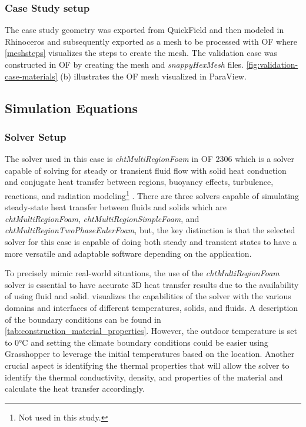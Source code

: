 \subsubsection{Case Study setup}
The case study geometry was exported from QuickField and then modeled in Rhinoceros and subsequently exported as a mesh to be processed with \gls{OF} where \ref{meshsteps} visualizes the steps to create the mesh. 
The validation case was constructed in \gls{OF} by creating the mesh and \textit{snappyHexMesh} files.  
\ref{fig:validation-case-materials}  (b) illustrates the \gls{OF} mesh visualized in ParaView.
    



\subsection{Simulation Equations}

\subsubsection{Solver Setup}
The solver used in this case is \textit{chtMultiRegionFoam} in  \gls{OF} 2306 which is a solver capable of solving for steady or transient fluid flow with solid heat conduction and conjugate heat transfer between regions, buoyancy effects, turbulence, reactions, and radiation modeling\footnote{Not used in this study.} \cite{cht}.
There are three solvers capable of simulating steady-state heat transfer between fluids and solids which are \textit{chtMultiRegionFoam}, \textit{chtMultiRegionSimpleFoam}, and \textit{chtMultiRegionTwoPhaseEulerFoam}, but, the key distinction is that the selected solver for this case is capable of doing both steady and transient states to have a more versatile and adaptable software depending on the application. 


To precisely mimic real-world situations, the use of the \textit{ chtMultiRegionFoam} solver is essential to have accurate 3D heat transfer results due to the availability of using fluid and solid.  visualizes the capabilities of the solver with the various domains and interfaces of different temperatures, solids, and fluids. 
A description of the boundary conditions can be found in \cref{tab:construction_material_properties}. 
However, the outdoor temperature is set to 0°C and setting the climate boundary conditions could be easier using Grasshopper to leverage the initial temperatures based on the location. 
Another crucial aspect is identifying the thermal properties that will allow the solver to identify the thermal conductivity, density, and properties of the material and calculate the heat transfer accordingly.

